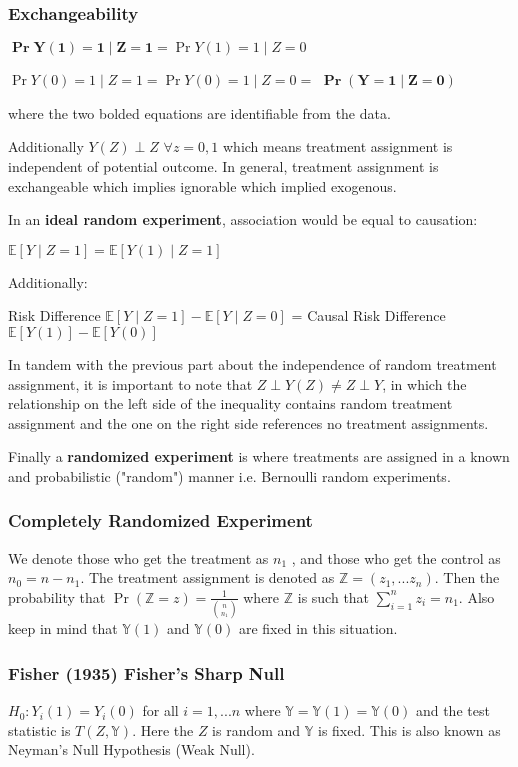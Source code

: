 \subsubsection{Exchangeability}
$\boldsymbol{\Pr{Y(1) = 1 \mid Z = 1}}= \Pr{Y(1) = 1 \mid Z = 0}$

$\Pr{Y(0) = 1 \mid Z = 1} = \Pr{Y(0) = 1 \mid Z = 0} =$
$ 
\boldsymbol{\Pr(Y = 1 \mid Z = 0)}$

where the two bolded equations are identifiable from the data. 

    Additionally $Y(Z) \perp Z$  $\forall  z = 0, 1$ which means treatment assignment is independent of potential outcome. In general, treatment assignment is exchangeable which implies ignorable which implied exogenous.

    In an \textbf{ideal random experiment}, association would be equal to causation:
\begin{center}$\mathbb{E}[Y \mid Z=1] = \mathbb{E}[Y(1)\mid Z=1]$ \end{center}
    Additionally:
\begin{center} Risk Difference $\mathbb{E}[Y \mid Z=1] - \mathbb{E}[Y\mid Z=0]$ = Causal Risk Difference $\mathbb{E}[Y(1)] - \mathbb{E}[Y(0)]$\end{center}
In tandem with the previous part about the independence of random treatment assignment, it is important to note that $Z \perp 
 Y(Z) \neq Z\perp Y$,  in which the relationship on the left side of the inequality contains random treatment assignment and the one on the right side references no treatment assignments.

    Finally a \textbf{randomized experiment} is where treatments are assigned in a known and probabilistic ("random") manner i.e. Bernoulli random experiments.

 \subsubsection{Completely Randomized Experiment}
    We denote those who get the treatment as $n_1$ , and those who get the control as $n_0 = n - n_1$. The treatment assignment is denoted as $\mathbb{Z}= (z_1, ... z_n)$.  Then the probability that $\Pr(\mathbb{Z}=z ) = \frac{1}{\binom{n}{n_1}}$ where $\mathbb{Z}$ is such that $\sum_{i=1}^{n} z_i = n_1$. Also keep in mind that $\mathbb{Y}(1)$ and $\mathbb{Y}(0)$ are fixed in this situation.

\subsubsection{Fisher (1935) Fisher's Sharp Null}
    $H_0: Y_i(1) = Y_i(0)$ for all $i = 1,...n$ where $\mathbb{Y} = \mathbb{Y}(1) = \mathbb{Y}(0)$ and the test statistic is $T(Z, \mathbb{Y})$. Here the $Z$ is random and $\mathbb{Y}$ is fixed. This is also known as Neyman's Null Hypothesis (Weak Null).
    
